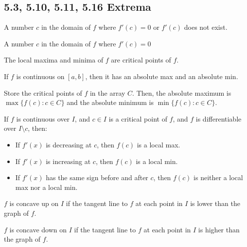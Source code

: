 \subsection*{5.3, 5.10, 5.11, 5.16 Extrema}

\begin{definition}
  A number $c$ in the domain of $f$ where $f'(c) = 0$ or $f'(c)$ does not exist.
\end{definition}

\begin{definition}
  A number $c$ in the domain of $f$ where $f'(c) = 0$
\end{definition}

\begin{namedtheorem}
  The local maxima and minima of $f$ are critical points of $f$.
\end{namedtheorem}

\begin{namedtheorem}
  If $f$ is continuous on $[a, b]$, then it has an absolute max and an absolute min.
\end{namedtheorem}

\begin{theorem}
  Store the critical points of $f$ in the array $C$. Then, the absolute maximum is $\max \{f(c) : c \in C\}$ and the absolute minimum is $\min \{f(c) : c \in C\}$.
\end{theorem}

\begin{theorem}
  If $f$ is continuous over $I$, and $c \in I$ is a critical point of $f$, and $f$ is differentiable over $I \setminus {c}$, then:

  \begin{itemize}
    \item If $f'(x)$ is decreasing at $c$, then $f(c)$ is a local max.
    \item If $f'(x)$ is increasing at $c$, then $f(c)$ is a local min.
    \item If $f'(x)$ has the same sign before and after $c$, then $f(c)$ is neither a local max nor a local min.
  \end{itemize}
\end{theorem}

\begin{definition}[Concavity]
  $f$ is concave up on $I$ if the tangent line to $f$ at each point in $I$ is lower than the graph of $f$.

  $f$ is concave down on $I$ if the tangent line to $f$ at each point in $I$ is higher than the graph of $f$.
\end{definition}

